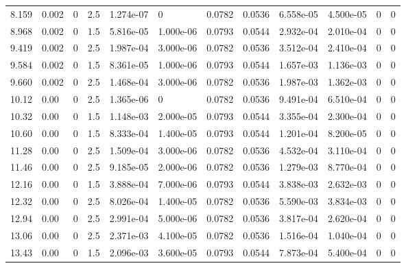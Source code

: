 \documentclass[preview]{standalone}
\begin{document}
{{\begin{tabular}{L{1.2cm}C{1.2cm} C{0.3cm}C{0.5cm} C{1.4cm}C{1.4cm} C{1.4cm}C{1.4cm} C{1.6cm}C{1.6cm} C{1.6cm}C{1.6cm}}
  8.159  &  0.002  & 0     & 2.5 &  1.274e-07  & 0  &  0.0782&   0.0536& 6.558e-05 & 4.500e-05   &  0 & 0  \\ 
  8.968  &  0.002  & 0     & 1.5 &  5.816e-05  & 1.000e-06  &  0.0793&   0.0544& 2.932e-04 & 2.010e-04   &  0 & 0  \\ 
  9.419  &  0.002  & 0     & 2.5 &  1.987e-04  & 3.000e-06  &  0.0782&   0.0536& 3.512e-04 & 2.410e-04   &  0 & 0  \\ 
  9.584  &  0.002  & 0     & 1.5 &  8.361e-05  & 1.000e-06  &  0.0793&   0.0544& 1.657e-03 & 1.136e-03   &  0 & 0  \\ 
  9.660  &  0.002  & 0     & 2.5 &  1.468e-04  & 3.000e-06  &  0.0782&   0.0536& 1.987e-03 & 1.362e-03   &  0 & 0  \\ 
  10.12  &  0.00  & 0     & 2.5 &  1.365e-06  & 0  &  0.0782&   0.0536& 9.491e-04 & 6.510e-04   &  0 & 0  \\ 
  10.32  &  0.00  & 0     & 1.5 &  1.148e-03  & 2.000e-05  &  0.0793&   0.0544& 3.355e-04 & 2.300e-04   &  0 & 0  \\ 
  10.60  &  0.00  & 0     & 1.5 &  8.333e-04  & 1.400e-05  &  0.0793&   0.0544& 1.201e-04 & 8.200e-05   &  0 & 0  \\ 
  11.28  &  0.00  & 0     & 2.5 &  1.509e-04  & 3.000e-06  &  0.0782&   0.0536& 4.532e-04 & 3.110e-04   &  0 & 0  \\ 
  11.46  &  0.00  & 0     & 2.5 &  9.185e-05  & 2.000e-06  &  0.0782&   0.0536& 1.279e-03 & 8.770e-04   &  0 & 0  \\ 
  12.16  &  0.00  & 0     & 1.5 &  3.888e-04  & 7.000e-06  &  0.0793&   0.0544& 3.838e-03 & 2.632e-03   &  0 & 0  \\ 
  12.32  &  0.00  & 0     & 2.5 &  8.026e-04  & 1.400e-05  &  0.0782&   0.0536& 5.590e-03 & 3.834e-03   &  0 & 0  \\ 
  12.94  &  0.00  & 0     & 2.5 &  2.991e-04  & 5.000e-06  &  0.0782&   0.0536& 3.817e-04 & 2.620e-04   &  0 & 0  \\ 
  13.06  &  0.00  & 0     & 2.5 &  2.371e-03  & 4.100e-05  &  0.0782&   0.0536& 1.516e-04 & 1.040e-04   &  0 & 0  \\ 
  13.43  &  0.00  & 0     & 1.5 &  2.096e-03  & 3.600e-05  &  0.0793&   0.0544& 7.873e-04 & 5.400e-04   &  0 & 0  \\ 
\hline 
\end{tabular} 

}}
\end{document}
